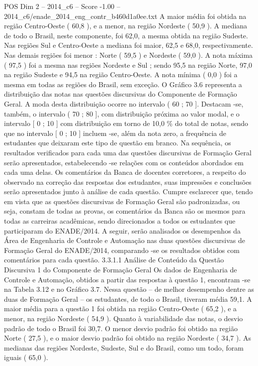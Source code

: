 \begin{textsample}{POS Dim 2 – 2014\_c6 – Score -1.00 – 2014\_c6/enade\_2014\_eng\_contr\_b460d1a0ee.txt}
A maior média foi obtida na região Centro-Oeste ( 60,8 ), e a menor, na região Nordeste ( 50,9 ).
A mediana de todo o Brasil, neste componente, foi 62,0, a mesma obtida na região Sudeste.
Nas regiões Sul e Centro-Oeste a mediana foi maior, 62,5 e 68,0, respectivamente.
Nas demais regiões foi menor : Norte ( 59,5 ) e Nordeste ( 59,0 ).
A nota máxima ( 97,5 ) foi a mesma nas regiões Nordeste e Sul ; sendo 95,5 na região Norte, 97,0 na região Sudeste e 94,5 na região Centro-Oeste.
A nota mínima ( 0,0 ) foi a mesma em todas as regiões do Brasil, sem exceção.
O Gráfico 3.6 representa a distribuição das notas nas questões discursivas do Componente de Formação Geral.
A moda desta distribuição ocorre no intervalo ( 60 ; 70 ].
Destacam -se, também, o intervalo ( 70 ; 80 ], com distribuição próxima ao valor modal, e o intervalo [ 0 ; 10 ] com distribuição em torno de 10,0 \% do total de notas, sendo que no intervalo [ 0 ; 10 ] incluem -se, além da nota zero, a frequência de estudantes que deixaram este tipo de questão em branco.
Na sequência, os resultados verificados para cada uma das questões discursivas de Formação Geral serão apresentados, estabelecendo -se relações com os conteúdos abordados em cada uma delas.
Os comentários da Banca de docentes corretores, a respeito do observado na correção das respostas dos estudantes, suas impressões e conclusões serão apresentados junto à análise de cada questão.
Cumpre esclarecer que, tendo em vista que as questões discursivas de Formação Geral são padronizadas, ou seja, constam de todas as provas, os comentários da Banca são os mesmos para todas as carreiras acadêmicas, sendo direcionados a todos os estudantes que participaram do ENADE/2014.
A seguir, serão analisados os desempenhos da Área de Engenharia de Controle e Automação nas duas questões discursivas de Formação Geral do ENADE/2014, comparando -se os resultados obtidos com comentários para cada questão. 3.3.1.1 Análise de Conteúdo da Questão Discursiva 1 do Componente de Formação Geral Os dados de Engenharia de Controle e Automação, obtidos a partir das respostas à questão 1, encontram -se na Tabela 3.12 e no Gráfico 3.7.
Nessa questão – de melhor desempenho dentre as duas de Formação Geral – os estudantes, de todo o Brasil, tiveram média 59,1.
A maior média para a questão 1 foi obtida na região Centro-Oeste ( 65,2 ), e a menor, na região Nordeste ( 54,9 ).
Quanto à variabilidade das notas, o desvio padrão de todo o Brasil foi 30,7.
O menor desvio padrão foi obtido na região Norte ( 27,5 ), e o maior desvio padrão foi obtido na região Nordeste ( 34,7 ).
As medianas das regiões Nordeste, Sudeste, Sul e do Brasil, como um todo, foram iguais ( 65,0 ).

\end{textsample}
